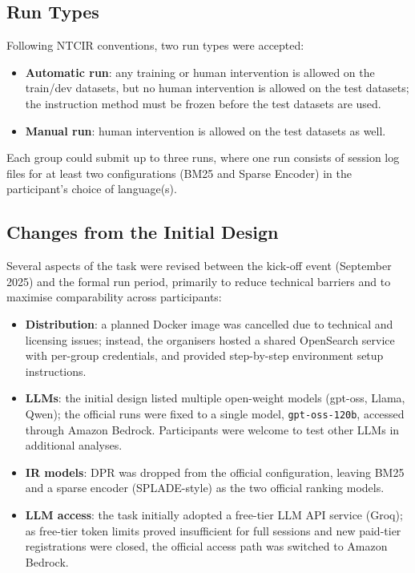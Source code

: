 \documentclass[sigconf,article]{acmart}
\begin{document}
\subsection{Run Types}

Following NTCIR conventions, two run types were accepted:

\begin{itemize}
  \item \textbf{Automatic run}: any training or human intervention is allowed
  on the train/dev datasets, but no human intervention is allowed on the test
  datasets; the instruction method must be frozen before the test datasets are
  used.
  \item \textbf{Manual run}: human intervention is allowed on the test
  datasets as well.
\end{itemize}

Each group could submit up to three runs, where one run consists of session
log files for at least two configurations (BM25 and Sparse Encoder) in the
participant's choice of language(s).

\subsection{Changes from the Initial Design}
\label{sec:changes}

Several aspects of the task were revised between the kick-off event
(September 2025) and the formal run period, primarily to reduce technical
barriers and to maximise comparability across participants:

\begin{itemize}
  \item \textbf{Distribution}: a planned Docker image was cancelled due to
  technical and licensing issues; instead, the organisers hosted a shared
  OpenSearch service with per-group credentials, and provided step-by-step
  environment setup instructions.
  \item \textbf{LLMs}: the initial design listed multiple open-weight models
  (gpt-oss, Llama, Qwen); the official runs were fixed to a single model,
  \texttt{gpt-oss-120b}, accessed through Amazon Bedrock. Participants were
  welcome to test other LLMs in additional analyses.
  \item \textbf{IR models}: DPR was dropped from the official configuration,
  leaving BM25 and a sparse encoder (SPLADE-style) as the two official
  ranking models.
  \item \textbf{LLM access}: the task initially adopted a free-tier LLM API
  service (Groq); as free-tier token limits proved insufficient for full
  sessions and new paid-tier registrations were closed, the official access
  path was switched to Amazon Bedrock.
\end{itemize}
\end{document}
